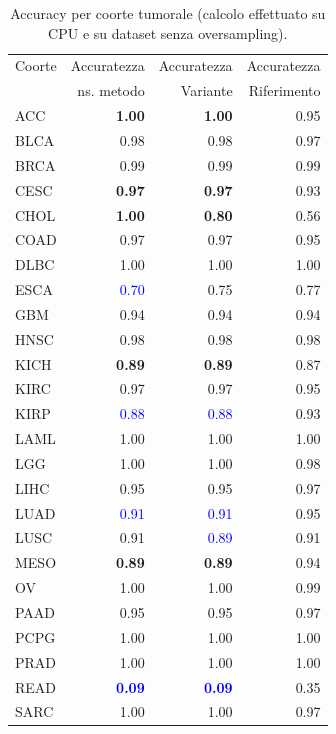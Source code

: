 \begin{table}[h!]
    \centering 
    \caption{Accuracy per coorte tumorale (calcolo effettuato su CPU e su dataset senza oversampling).}
    \large{
    \begin{tabular}{lrrr}
    \toprule
     Coorte  & Accuratezza & Accuratezza & Accuratezza \\
             & ns. metodo  & Variante    & Riferimento \\
    \midrule
     ACC  & \textbf{1.00} & \textbf{1.00} & 0.95 \\
     BLCA &  0.98 & 0.98 & 0.97 \\
     BRCA &  0.99 & 0.99 & 0.99 \\
     CESC &  \textbf{0.97} & \textbf{0.97} & 0.93 \\
     CHOL &  \textbf{1.00} & \textbf{0.80} & 0.56 \\
     COAD &  0.97 & 0.97 & 0.95 \\
     DLBC &  1.00 & 1.00 & 1.00 \\
     ESCA &  \textcolor{blue}{0.70} & 0.75 & 0.77 \\
     GBM  &  0.94 & 0.94 & 0.94 \\
     HNSC &  0.98 & 0.98 & 0.98 \\
     KICH &  \textbf{0.89} & \textbf{0.89} & 0.87 \\
     KIRC &  0.97 & 0.97 & 0.95 \\
     KIRP &  \textcolor{blue}{0.88} & \textcolor{blue}{0.88} & 0.93 \\
     LAML &  1.00 & 1.00 & 1.00 \\
     LGG  &  1.00 & 1.00 & 0.98 \\
     LIHC &  0.95 & 0.95 & 0.97 \\
     LUAD &  \textcolor{blue}{0.91} & \textcolor{blue}{0.91} & 0.95 \\
     LUSC &  0.91 & \textcolor{blue}{0.89} & 0.91 \\
     MESO &  \textbf{0.89} & \textbf{0.89} & 0.94 \\
     OV   &  1.00 & 1.00 & 0.99 \\
     PAAD &  0.95 & 0.95 & 0.97 \\
     PCPG &  1.00 & 1.00 & 1.00 \\
     PRAD &  1.00 & 1.00 & 1.00 \\
     READ &  \textcolor{blue}{\textbf{0.09}} & \textcolor{blue}{\textbf{0.09}} & 0.35 \\ 
     SARC &  1.00 & 1.00 & 0.97 \\ 

\end{tabular}}
\end{table}
